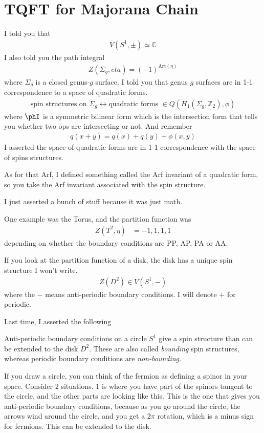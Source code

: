 \section{TQFT for Majorana Chain}
I told you that
\begin{align}
    V(S^1, \pm) \simeq \mathbb{C}
\end{align}
I also told you the path integral
\begin{align}
    Z(\Sigma_g,eta) = (-1)^{\textrm{Art}(\eta)}
\end{align}
where $\Sigma_g$ is a closed genus-$g$ surface.
I told you that genus $g$ surfaces are in 1-1 correspondence to a space of
quadratic forms.
\begin{align}
    \text{spin structures on }\Sigma_g \leftrightarrow
    \text{quadratic forms }\in Q\left( H_1\left( \Sigma_g, \mathbb{Z}_2 \right),
    \phi\right)
\end{align}
where $\phI$ is a symmetric bilinear form which is the intersection form that
tells you whether two ops are intersecting or not.
And remember
\begin{align}
    q(x + y) = q(x) + q(y) + \phi(x, y)
\end{align}
I asserted the space of quadratic forms are in 1-1 correspondence with the space
of spins structures.

As for that Arf,
I defined something called the Arf invariant of a quadratic form,
so you take the Arf invariant associated with the spin structure.

I just asserted a bunch of stuff because it was just math.

One example was the Torus, and the partition function was 
\begin{align}
    Z(T^2, \eta) &= -1, 1, 1, 1
\end{align}
depending on whether the boundary conditions are
PP, AP, PA or AA.

If you look at the partition function of a disk,
the disk has a unique spin structure I won't write.
\begin{align}
    Z\left( D^2 \right)
    \in
    V\left( S^1, - \right)
\end{align}
where the $-$ means anti-periodic boundary conditions.
I will denote $+$ for periodic.

Last time,
I asserted the following
\begin{proposition}
    Anti-periodic boundary conditions on a circle $S^1$ give a spin structure
    than can be extended to the disk $D^2$.
    These are also called \emph{bounding} spin structures,
    whereas periodic boundary conditions are \emph{non-bounding}.
\end{proposition}
If you draw a circle,
you can think of the fermion as defining a spinor in your space.
Consider 2 situations.
1 is where you have part of the spinors tangent to the circle,
and the other parts are looking like this.
This is the one that gives you anti-periodic boundary conditions,
because as you go around the circle,
the arrows wind around the circle,
and you get a $2\pi$ rotation,
which is a minus sign for fermions.
This can be extended to the disk.

